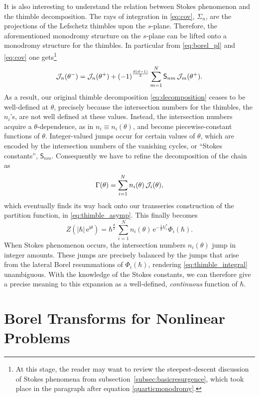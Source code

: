 \documentclass[11pt,a4paper]{article}
\newcommand{\CJ}{{\cal J}}
\newcommand{\be}{\begin{equation}}
\newcommand{\ee}{\end{equation}}
\newcommand{\rme}{{\mathrm{e}}}
\newcommand{\rmi}{{\mathrm{i}}}
\begin{document}
It is also interesting to understand the relation between Stokes phenomenon and the thimble decomposition. The rays of integration in \eqref{eq:cov}, $\Sigma_n$, are the projections of the Lefschetz thimbles upon the $s$-plane. Therefore, the aforementioned monodromy structure on the $s$-plane can be lifted onto a monodromy structure for the thimbles. In particular from \eqref{eq:borel_pl} and \eqref{eq:cov} one gets\footnote{At this stage, the reader may want to review the steepest-descent discussion of Stokes phenomena from subsection~\ref{subsec:basicresurgence}, which took place in the paragraph after equation \eqref{quarticmonodromy}.}
%
\be
\CJ_n (\theta^-) = \CJ_n (\theta^+) + \left(-1\right)^{\frac{d \left(d-1\right)}{2}} \sum_{m=1}^N \mathsf{S}_{nm}\, \CJ_m (\theta^+).
\ee
%
\noindent
As a result, our original thimble decomposition \eqref{eq:decomposition} ceases to be well-defined at $\theta$, precisely because the intersection numbers for the thimbles, the $n_i$'s, are not well defined at these values. Instead, the intersection numbers acquire a $\theta$-dependence, as in $n_i \equiv n_i(\theta)$, and become piecewise-constant functions of $\theta$. Integer-valued jumps occur for certain values of $\theta$, which are encoded by the intersection numbers of the vanishing cycles, or ``Stokes constants'', $\mathsf{S}_{nm}$. Consequently we have to refine the decomposition of the chain as
%
\be
\label{eq:decomposition2}
\Gamma (\theta) = \sum_{i=1}^N n_i(\theta)\, \CJ_i (\theta),
\ee
%
\noindent
which eventually finds its way back onto our transseries construction of the partition function, in \eqref{eq:thimble_asymp}. This finally becomes
%
\be
\label{eq:thimble_integral}
Z (|\hbar|\, \rme^{\rmi\theta}) = \hbar^{\frac{d}{2}}\, \sum_{i=1}^N n_i (\theta)\, \rme^{- \frac{1}{\hbar} V^*_i} \Phi_i(\hbar).
\ee
%
\noindent
When Stokes phenomenon occurs, the intersection numbers $n_i(\theta)$ jump in integer amounts. These jumps are precisely balanced by the jumps that arise from the lateral Borel resummations of $\Phi_i(\hbar)$, rendering \eqref{eq:thimble_integral} unambiguous. With the knowledge of the Stokes constants, we can therefore give a precise meaning to this expansion as a well-defined, \textit{continuous} function of $\hbar$.


\section{Borel Transforms for Nonlinear Problems}\label{sec:borel}
\end{document}

